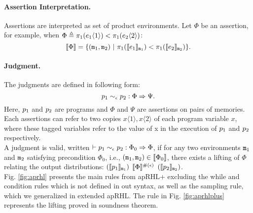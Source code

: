 \documentclass[a4paper,11pt]{article}
\begin{document}
\paragraph{Assertion Interpretation.} Assertions are interpreted as set of product environments. Let $\Phi$ be an assertion,
%
for example, when $\Phi \triangleq \pi_1(e_1\langle 1 \rangle) < \pi_1(e_2\langle 2 \rangle)$:
\[
	\llbracket \Phi \rrbracket = \{(\mathtt{m}_1, \mathtt{m}_2)
	~|~ \pi_1(\llbracket e_1 \rrbracket_{\mathtt{m}_1}) 
	< \pi_1(\llbracket e_2 \rrbracket_{\mathtt{m}_2}) \}.
\]
%
%
\paragraph{Judgment.}
The judgments are defined in following form:
\[
	p_1 \sim_{\epsilon} p_2: \Phi \Rightarrow \Psi.
\]
Here, $p_1$ and $p_2$ are programs and $\Phi$ and $\Psi$ are assertions on pairs of memories. Each assertions can refer to two copies $x\langle 1 \rangle, x\langle 2 \rangle$ of each program variable $x$, where these tagged variables refer to the value of x in the execution of $p_1$ and $p_2$ respectively.
%
\\
A judgment is valid, written $\vdash p_1 \sim_{\epsilon} p_2: \Phi_0 \Rightarrow \Phi$, 
if for any two environments $\mathtt{m}_1$ and $\mathtt{m}_2$ satisfying precondition $\Phi_0$, 
i.e., $(\mathtt{m}_1, \mathtt{m}_2) \in \llbracket \Phi_0 \rrbracket$, there exists a lifting of $\Phi$ relating the output distributions: 
%
$(\llbracket p_1 \rrbracket_{\mathtt{m}_1})$ 
$\llbracket \Phi \rrbracket^{\#(\epsilon)}$ 
$(\llbracket p_2 \rrbracket_{\mathtt{m}_2})$.
%
\\
%
Fig. \ref{fig:aprhl} presents the main rules from apRHL+ \cite{barthe2016proving} excluding the while and condition rules which is not defined in out syntax, as well as the sampling rule, which we generalized in extended apRHL.
The rule in Fig. \ref{fig:aprhlplus} represents the lifting proved in soundness theorem.
%
\end{document}
